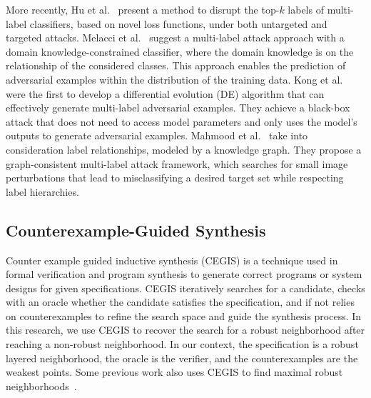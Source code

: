     More recently, Hu et al.~\cite{Hu_2021_ICCV} present a method to disrupt the top-$k$ labels of multi-label classifiers, based on novel loss functions, under both untargeted and targeted attacks.
    Melacci et al.~\cite{melacci:hal-02971233} suggest a multi-label attack approach with a domain knowledge-constrained classifier, where the domain knowledge is on the relationship of the considered classes.
    This approach enables the prediction of adversarial examples within the distribution of the training data.
    Kong et al.~\cite{9857594} were the first to develop a differential evolution (DE) algorithm that can effectively generate multi-label adversarial examples.
    They achieve a black-box attack that does not need to access model parameters and only uses the model's outputs to generate adversarial examples.
    Mahmood et al.~\cite{mahmood2022effective} take into consideration label relationships, modeled by a knowledge graph.
    They propose a graph-consistent multi-label attack framework, which searches for small image perturbations that lead to misclassifying a desired target set while respecting label hierarchies.

\subsection{Counterexample-Guided Synthesis}
Counter example guided inductive synthesis (CEGIS) is a technique used in formal verification and program synthesis to generate correct programs or system designs for given specifications.
CEGIS iteratively searches for a candidate, checks with an oracle whether the candidate satisfies the specification, and if not relies on counterexamples to refine the search space and guide the synthesis process.
In this research, we use CEGIS to recover the search for a robust neighborhood after reaching a non-robust neighborhood. %
In our context, the specification is a robust layered neighborhood, the oracle is the verifier, and the counterexamples are the weakest points.
Some previous work also uses CEGIS to find maximal robust neighborhoods~\cite{CEGIS1, MARVEL, CEGIS2, CEGIS3}. %